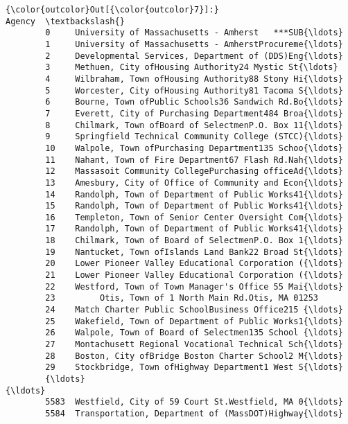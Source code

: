 \documentclass[11pt]{article}
\begin{document}
\begin{Verbatim}[commandchars=\\\{\}]
{\color{outcolor}Out[{\color{outcolor}7}]:}                                                  Agency  \textbackslash{}
        0     University of Massachusetts - Amherst   ***SUB{\ldots}   
        1     University of Massachusetts - AmherstProcureme{\ldots}   
        2     Developmental Services, Department of (DDS)Eng{\ldots}   
        3     Methuen, City ofHousing Authority24 Mystic St{\ldots}   
        4     Wilbraham, Town ofHousing Authority88 Stony Hi{\ldots}   
        5     Worcester, City ofHousing Authority81 Tacoma S{\ldots}   
        6     Bourne, Town ofPublic Schools36 Sandwich Rd.Bo{\ldots}   
        7     Everett, City of Purchasing Department484 Broa{\ldots}   
        8     Chilmark, Town ofBoard of SelectmenP.O. Box 11{\ldots}   
        9     Springfield Technical Community College (STCC){\ldots}   
        10    Walpole, Town ofPurchasing Department135 Schoo{\ldots}   
        11    Nahant, Town of Fire Department67 Flash Rd.Nah{\ldots}   
        12    Massasoit Community CollegePurchasing officeAd{\ldots}   
        13    Amesbury, City of Office of Community and Econ{\ldots}   
        14    Randolph, Town of Department of Public Works41{\ldots}   
        15    Randolph, Town of Department of Public Works41{\ldots}   
        16    Templeton, Town of Senior Center Oversight Com{\ldots}   
        17    Randolph, Town of Department of Public Works41{\ldots}   
        18    Chilmark, Town of Board of SelectmenP.O. Box 1{\ldots}   
        19    Nantucket, Town ofIslands Land Bank22 Broad St{\ldots}   
        20    Lower Pioneer Valley Educational Corporation ({\ldots}   
        21    Lower Pioneer Valley Educational Corporation ({\ldots}   
        22    Westford, Town of Town Manager's Office 55 Mai{\ldots}   
        23         Otis, Town of 1 North Main Rd.Otis, MA 01253   
        24    Match Charter Public SchoolBusiness Office215 {\ldots}   
        25    Wakefield, Town of Department of Public Works1{\ldots}   
        26    Walpole, Town of Board of Selectmen135 School {\ldots}   
        27    Montachusett Regional Vocational Technical Sch{\ldots}   
        28    Boston, City ofBridge Boston Charter School2 M{\ldots}   
        29    Stockbridge, Town ofHighway Department1 West S{\ldots}   
        {\ldots}                                                 {\ldots}   
        5583  Westfield, City of 59 Court St.Westfield, MA 0{\ldots}   
        5584  Transportation, Department of (MassDOT)Highway{\ldots}   

\end{Verbatim}
\end{document}

